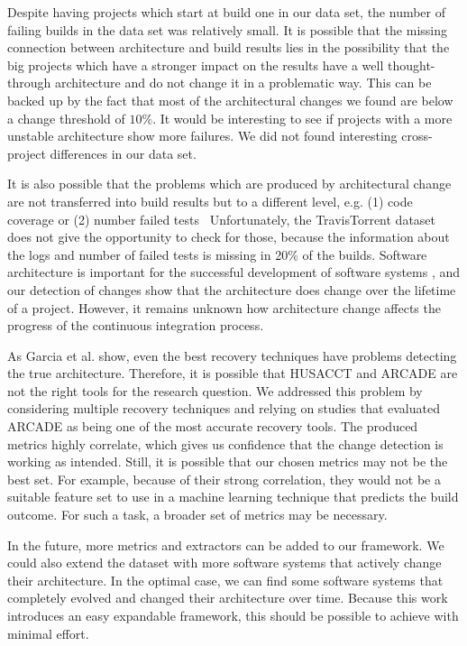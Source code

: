 \documentclass[sigconf, anonymous, review]{acmart}
\begin{document}
Despite having projects which start at build one in our data set, the number of failing builds in the data set was relatively small. 
It is possible that the missing connection between architecture and build results lies in the possibility that the big projects which have a stronger impact on the results have a well thought-through architecture and do not change it in a problematic way.
This can be backed up by the fact that most of the architectural changes we found are below a change threshold of $10\%$. It would be interesting to see if projects with a more unstable architecture show more failures. We did not found interesting cross-project differences in our data set.

It is also possible that the problems which are produced by architectural change are not transferred into build results but to a different level, e.g. (1) code coverage or (2) number failed tests~ Unfortunately, the TravisTorrent dataset does not give the opportunity to check for those, because the information about the logs and number of failed tests is missing in 20\% of the builds.
Software architecture is important for the successful development of software systems \cite{ADLs1}, and our detection of changes show that the architecture does change over the lifetime of a project. However, it remains unknown how architecture change affects the progress of the continuous integration process.

As Garcia et al. \cite{arcRec-comparison} show, even the best recovery techniques have problems detecting the true architecture. Therefore, it is possible that HUSACCT and ARCADE are not the right tools for the research question. We addressed this problem by considering multiple recovery techniques and relying on studies that evaluated ARCADE as being one of the most accurate recovery tools. The produced metrics highly correlate, which gives us confidence that the change detection is working as intended. Still, it is possible that our chosen metrics may not be the best set. For example, because of their strong correlation, they would not be a suitable feature set to use in a machine learning technique that predicts the build outcome. For such a task, a broader set of metrics may be necessary. 

In the future, more metrics and extractors can be added to our framework.  
We could also extend the dataset with more software systems that actively change their architecture. In the optimal case, we can find some software systems that completely evolved and changed their architecture over time. 
Because this work introduces an easy expandable framework, this should be possible to achieve with minimal effort.
\end{document}
